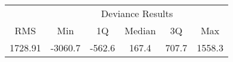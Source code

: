 \documentclass{article}
\begin{document}
\begin{tabular}{cccccc}
  \toprule
  &\multicolumn{5}{c}{Deviance Results}\\
  \cmidrule{2-6}
  RMS & Min & 1Q & Median & 3Q & Max\\
  \midrule
  1728.91 & -3060.7  & -562.6 &   167.4 &   707.7 &  1558.3\\
  \bottomrule
\end{tabular}
\end{document}
